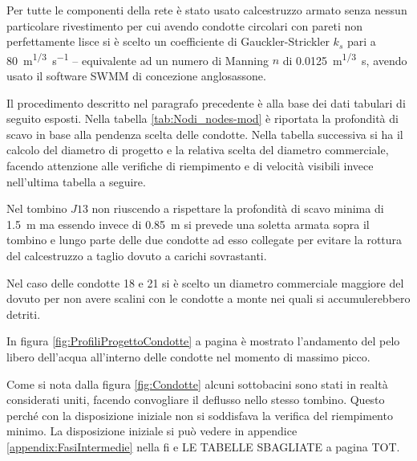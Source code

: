 Per tutte le componenti della rete è stato usato calcestruzzo armato senza nessun particolare rivestimento per cui avendo condotte circolari con pareti non perfettamente lisce si è scelto un coefficiente di Gauckler-Strickler $k_s$ pari a \SI{80}{\metre\tothe{1/3}\per\second} -- equivalente ad un numero di Manning $n$ di \SI{0.0125}{\metre\tothe{1/3}\second}, avendo usato il software SWMM di concezione anglosassone.

Il procedimento descritto nel paragrafo precedente è alla base dei dati tabulari di seguito esposti.  
Nella tabella \ref{tab:Nodi_nodes-mod} è riportata la profondità di scavo in base alla pendenza scelta delle condotte. 
Nella tabella successiva si ha il calcolo del diametro di progetto e la relativa scelta del diametro commerciale, facendo attenzione alle verifiche di riempimento e di velocità visibili invece nell'ultima tabella a seguire.

Nel tombino $J13$ non riuscendo a rispettare la profondità di scavo minima di \SI{1.5}{\metre} ma essendo invece di \SI{0.85}{\metre} si prevede una soletta armata sopra il tombino e lungo parte delle due condotte ad esso collegate per evitare la rottura del calcestruzzo a taglio dovuto a carichi sovrastanti. 

Nel caso delle condotte 18 e 21 si è scelto un diametro commerciale maggiore del dovuto per non avere scalini con le condotte a monte nei quali si accumulerebbero detriti. 

In figura \ref{fig:ProfiliProgettoCondotte} a pagina \pageref{fig:ProfiliProgettoCondotte} è mostrato l'andamento del pelo libero dell'acqua all'interno delle condotte nel momento di massimo picco.

Come si nota dalla figura \ref{fig:Condotte} alcuni sottobacini sono stati in realtà considerati uniti, facendo convogliare il deflusso nello stesso tombino.
Questo perché con la disposizione iniziale non si soddisfava la verifica del riempimento minimo.
La disposizione iniziale si può vedere in appendice \ref{appendix:FasiIntermedie} nella fi e LE TABELLE SBAGLIATE a pagina TOT.


